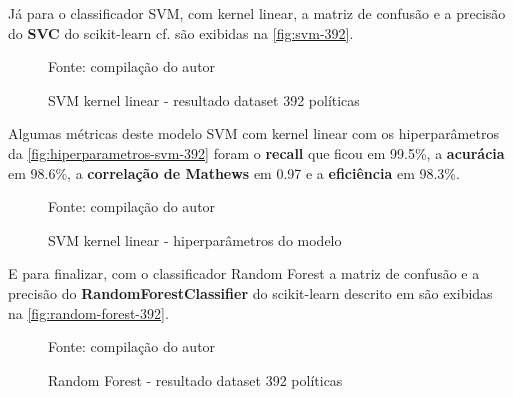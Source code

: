 Já para o classificador SVM, com kernel linear, a matriz de confusão e a precisão do \textbf{SVC} do scikit-learn cf.  são exibidas na \autoref{fig:svm-392}.
\begin{figure}[h!]
	\centering
	\caption{SVM kernel linear - resultado dataset 392 políticas}
	
	\label{fig:svm-392}
	{\scriptsize Fonte: compilação do autor}
\end{figure}

Algumas métricas deste modelo SVM com kernel linear com os hiperparâmetros da \autoref{fig:hiperparametros-svm-392} foram o \textbf{recall} que ficou em 99.5\%, a \textbf{acurácia} em 98.6\%, a \textbf{correlação de Mathews} em 0.97 e a \textbf{eficiência} em 98.3\%. 

\begin{figure}[h!]
	\centering
	\caption{SVM kernel linear - hiperparâmetros do modelo}
	
	\label{fig:hiperparametros-svm-392}
	{\scriptsize Fonte: compilação do autor}
\end{figure}

E para finalizar, com o classificador Random Forest a matriz de confusão e a precisão do \textbf{RandomForestClassifier} do scikit-learn descrito em  são exibidas na \autoref{fig:random-forest-392}.

\begin{figure}[h!]
	\centering
	\caption{Random Forest - resultado dataset 392 políticas}
	
	\label{fig:random-forest-392}
	{\scriptsize Fonte: compilação do autor}
\end{figure}

